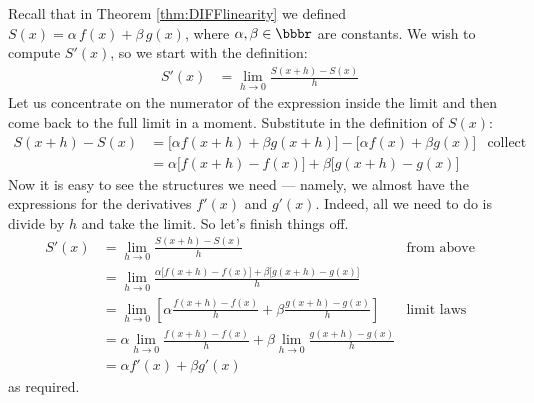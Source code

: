 Recall that in Theorem \ref{thm:DIFFlinearity} we defined
$S(x)=\alpha\,f(x)+\beta\,g(x)$, where $\alpha,\beta\in\bbbr$
are constants. We wish to compute $S'(x)$, so we start with the definition:
\begin{align*}
  S'(x) &= \lim_{h \to 0} \frac{S(x+h)-S(x)}{h}
\end{align*}
Let us concentrate on the numerator of the expression inside the limit and then come
back to the full limit in a moment. Substitute in the definition of $S(x)$:
\begin{align*}
  S(x+h)-S(x) &=
  \big[ \alpha f(x+h) + \beta g(x+h) \big] -
  \big[ \alpha f(x) + \beta g(x) \big]  &\text{collect terms} \\
&=\alpha\big[f(x+h)-f(x)]+\beta\big[g(x+h)-g(x)\big]
\end{align*}
Now it is easy to see the structures we need --- namely, we almost have the expressions
for the derivatives $f'(x)$ and $g'(x)$. Indeed, all we need to do is divide by $h$ and
take the limit. So let's finish things off.
\begin{align*}
  S'(x) &= \lim_{h \to 0} \frac{S(x+h)-S(x)}{h} & \text{from above}\\
  &= \lim_{h \to 0} \frac{\alpha\big[f(x+h)-f(x)]+\beta\big[g(x+h)-g(x)\big] }{h} \\
  &= \lim_{h \to 0} \left[ \alpha\frac{f(x+h)-f(x)}{h} + \beta\frac{g(x+h)-g(x)}{h}
\right] &\text{limit laws}\\
  &= \alpha\lim_{h \to 0} \frac{f(x+h)-f(x)}{h} + \beta\lim_{h\to0}\frac{g(x+h)-g(x)}{h}
\\
  &=\alpha f'(x) + \beta g'(x)
\end{align*}
as required.


